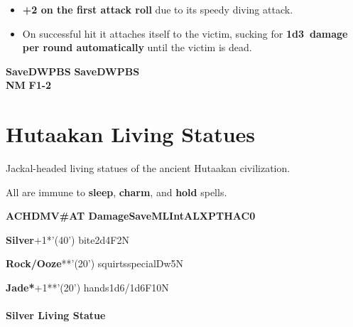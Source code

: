 \documentclass[english,11pt,openany,letterpaper,twocolumn]{book}
\begin{document}
\begin{itemize}[leftmargin=*,label=\itshape\textbullet]
\item
\textbf{+2 on the first attack roll} due to its speedy diving attack.
\item
On successful hit it attaches itself to the victim, sucking for \textbf{1d3~damage per round automatically} until the victim is dead.
\end{itemize}


\vfill


\tab
\overprintw[24\charwidth]{\_}%
\textbf{Save\tab D\tab W\tab P\tab B\tab S}\tab
\overprintw[24\charwidth]{\_}%
\textbf{Save\tab D\tab W\tab P\tab B\tab S}\\
\tab\textbf{NM}
\tab\textbf{F1-2}


\break


\hypertarget{statue}{}
\section{Hutaakan Living Statues}
\makeatletter
{}
\makeatother

Jackal-headed living statues of the ancient Hutaakan civilization.

All are immune to \textbf{sleep}, \textbf{charm}, and \textbf{hold} spells.


\ulf\textbf{\tab AC\tab HD\tab MV\tab \#AT \tab Damage\tab Save\tab ML\tab Int\tab AL\tab XP\tab THAC0}

\textbf{Silver}+1*'(40') bite\tab 2d4\tab F2\tab N

\textbf{Rock/Ooze}**'(20') squirts\tab special\tab Dw5\tab N

\ulf\textbf{Jade*}+1**'(20') hands\tab 1d6/1d6\tab F10\tab N



\paragraph{Silver Living Statue}
\vspace*{-\baselineskip}
\end{document}
